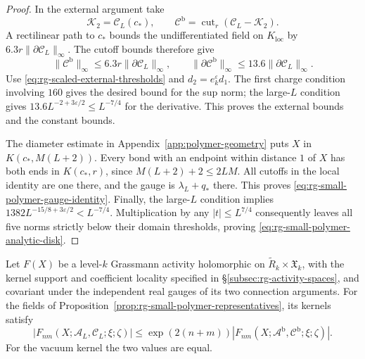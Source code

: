 \begin{proof}
In the external argument take
\[
 \mathscr K_2=\mathscr C_L(c_*),\qquad
 \mathscr C^{\mathrm b}
                   =\operatorname{cut}_r(\mathscr C_L-\mathscr K_2).
\]
A rectilinear path to $c_*$ bounds the undifferentiated
field on $K_{\mathrm{loc}}$ by
$6.3r\|\partial\mathscr C_L\|_\infty$.
The cutoff bounds therefore give
\[
 \|\mathscr C^{\mathrm b}\|_\infty
       \le6.3r\|\partial\mathscr C_L\|_\infty,\qquad
 \|\partial\mathscr C^{\mathrm b}\|_\infty
       \le13.6\|\partial\mathscr C_L\|_\infty.
\]
Use \eqref{eq:rg-scaled-external-thresholds} and
$d_2=e_k^\varepsilon d_1$. The first charge condition
involving $160$ gives the desired bound for the sup norm;
the large-$L$ condition gives
$13.6L^{-2+3\varepsilon/2}\le L^{-7/4}$ for the derivative.
This proves the external bounds and the constant bounds.

The diameter estimate in Appendix~\ref{app:polymer-geometry}
puts $X$ in $K(c_*,M(L+2))$. Every bond with an endpoint
within distance $1$ of $X$ has both ends in $K(c_*,r)$,
since $M(L+2)+2\le2LM$. All cutoffs in the local identity
are one there, and the gauge is $\lambda_L+q_*$ there.
This proves \eqref{eq:rg-small-polymer-gauge-identity}.
Finally, the large-$L$ condition implies
$1382L^{-15/8+3\varepsilon/2}<L^{-7/4}$.
Multiplication by any $|t|\le L^{7/4}$ consequently leaves
all five norms strictly below their domain thresholds,
proving \eqref{eq:rg-small-polymer-analytic-disk}.
\end{proof}

\begin{proposition}\label{prop:rg-small-polymer-kernel-comparison}
Let $F(X)$ be a level-$k$ Grassmann activity holomorphic on
$\widetilde R_k\times\mathfrak X_k$, with the kernel support
and coefficient locality specified in
\S\ref{subsec:rg-activity-spaces}, and covariant under the
independent real gauges of its two connection arguments.
For the fields of Proposition~\ref{prop:rg-small-polymer-representatives},
its kernels satisfy
\begin{equation}\label{eq:rg-small-polymer-kernel-comparison}
 |F_{nm}(X;\mathscr A_L,\mathscr C_L;\xi;\zeta)|
   \le\exp(2(n+m))
        |F_{nm}(X;\mathscr A^{\mathrm b},\mathscr C^{\mathrm b};\xi;\zeta)|.
\end{equation}
For the vacuum kernel the two values are equal.
\end{proposition}

